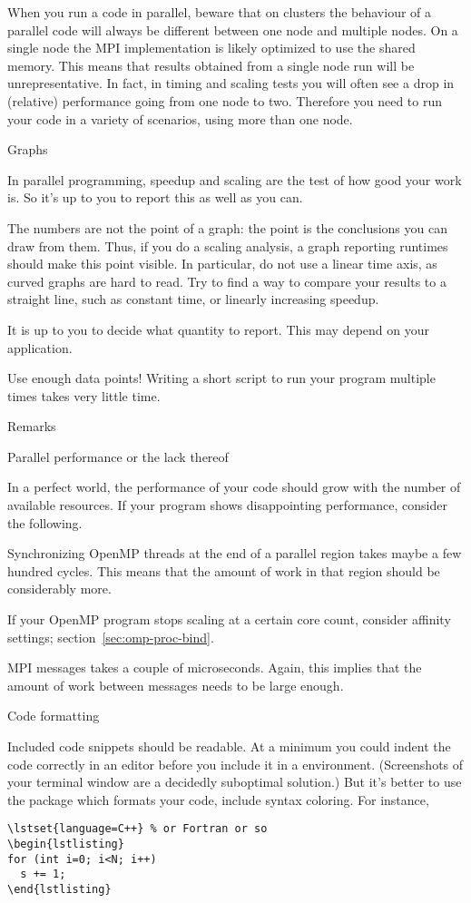 When you run a code in parallel, beware that on clusters the behaviour
of a parallel code will always be different between one node and
multiple nodes.  On a single node the MPI implementation is likely
optimized to use the shared memory. This means that results obtained
from a single node run will be unrepresentative. In fact, in timing
and scaling tests you will often see a drop in (relative) performance
going from one node to two.  Therefore you need to run your code in a
variety of scenarios, using more than one node.

 {Graphs}

In parallel programming, speedup and scaling are the test of
how good your work is.
So it's up to you to report this as well as you can.

The numbers are not the point of a graph: the point is
the conclusions you can draw from them.
Thus, if you do a scaling analysis,
a graph reporting runtimes should make this point visible.
In particular, do not use a linear time axis, as
curved graphs are hard to read. 
Try to find a way
to compare your results to a straight line, such as constant time, or
linearly increasing speedup.

It is up to you to decide what quantity to report.
This may depend on your application.

Use enough data points! Writing a short script to run
your program multiple times takes very little time.

 {Remarks}

 {Parallel performance or the lack thereof}

In a perfect world, the performance of your code should grow
with the number of available resources.
If your program shows disappointing performance,
consider the following.

Synchronizing OpenMP threads at the end of a parallel region takes
maybe a few hundred cycles. This means that the amount of work
in that region should be considerably more.

If your OpenMP program stops scaling at a certain core count,
consider affinity settings; section~\ref{sec:omp-proc-bind}.

MPI messages takes a couple of microseconds. Again, this implies that the
amount of work between messages needs to be large enough.

 {Code formatting}

Included code snippets should be readable. At a minimum you could 
indent the code correctly in an editor before you include it in
a  environment. (Screenshots of your terminal
window are a decidedly suboptimal solution.)
But it's better to use the  package which formats
your code, include syntax coloring. For instance, 
\begin{verbatim}
\lstset{language=C++} % or Fortran or so
\begin{lstlisting}
for (int i=0; i<N; i++)
  s += 1;
\end{lstlisting}
\end{verbatim}


